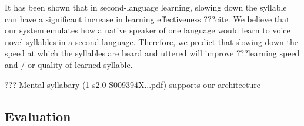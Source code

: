 It has been shown that in second-language learning,
slowing down the syllable can have
a significant increase in learning effectiveness
???cite.
We believe that our system emulates
how a native speaker of one language
would learn to voice novel syllables in a second language.
Therefore, we predict that slowing down
the speed at which the syllables are heard
and uttered will improve ???learning speed
and / or quality of learned syllable.

??? Mental syllabary (1-s2.0-S009394X...pdf)
supports our architecture

\subsection{Evaluation}
